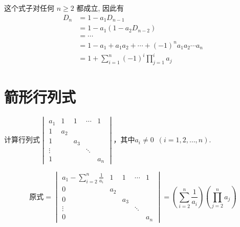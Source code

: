 \begin{solution}
    这个式子对任何 $n \geqslant 2$ 都成立, 因此有
    \begin{align*}
        D_n & =1-a_{1} D_{n-1}                                          \\
            & =1-a_{1}(1-a_{2} D_{n-2})                                 \\
            & =\cdots                                                   \\
            & =1-a_{1}+a_{1} a_{2}+\cdots+(-1)^n a_{1} a_{2} \cdots a_n \\
            & =1+\sum_{i=1}^{n}(-1)^i \prod_{j=1}^i a_j
    \end{align*}
\end{solution}

\section{箭形行列式}

\begin{example}
    计算行列式$\begin{vmatrix}
            a_1    & 1   & 1   & \cdots & 1   \\
            1      & a_2                      \\
            1      &     & a_3                \\
            \vdots &     &     & \ddots       \\
            1      &     &     &        & a_n
        \end{vmatrix}$，其中$a_i\neq 0\enspace(i=1,2,\ldots,n)$.
\end{example}

\begin{solution}
    \[ \text{原式}=\begin{vmatrix}
            a_1-\displaystyle\sum_{i=2}^n\frac{1}{a_i} & 1   & 1   & \cdots & 1   \\
            0                                          & a_2                      \\
            0                                          &     & a_3                \\
            \vdots                                     &     &     & \ddots       \\
            0                                          &     &     &        & a_n
        \end{vmatrix} = \left(\sum_{i=2}^n\frac{1}{a_i}\right) \left(\prod_{j=2}^na_j\right) \]
\end{solution}

